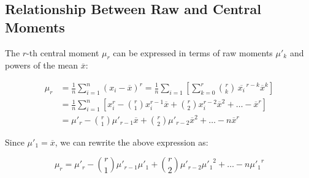 \documentclass[twoside]{book}
\begin{document}
\subsection{Relationship Between Raw and Central Moments}

The $r$-th central moment $\mu_r$ can be expressed in terms of raw moments $\mu'_k$ and powers of the mean $\overline{x}$:

\begin{align*}
    \mu_r &= \frac{1}{n} \sum_{i=1}^n (x_i - \overline{x})^r = \frac{1}{n}\sum_{i=1}\left[\sum_{k=0}^r \binom{r}{k}\,\overline{x_i}^{\,r-k} \overline{x}^k\right]\\
    &=\frac{1}{n}\sum_{i=1}^n\left[x_i^r - \binom{r}{1} x_i^{r-1}\overline{x} + \binom{r}{2} x_i^{r-2}\overline{x}^2 + \dots - \overline{x}^r\right]\\
    &=\mu'_r - \binom{r}{1} \mu'_{r-1}\overline{x} + \binom{r}{2} \mu'_{r-2}\overline{x}^2 + \dots - n\overline{x}^r
\end{align*}

Since $\mu'_1 = \overline{x}$, we can rewrite the above expression as:
\begin{textbox}
$$\mu_r = \mu'_r - \binom{r}{1} \mu'_{r-1}\mu'_1 + \binom{r}{2} \mu'_{r-2}{\mu'_1}^2 + \dots - n{\mu'_1}^r$$
\end{textbox}
\end{document}
